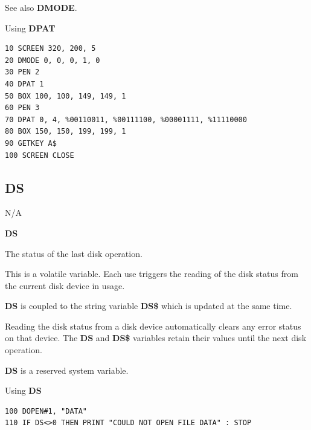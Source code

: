 \begin{description}[leftmargin=2cm,style=nextline]
                  See also {\bf DMODE}.

\item [Example:]  Using {\bf DPAT}

\begin{tcolorbox}[colback=black,coltext=white]
\verbatimfont{\codefont}
\begin{verbatim}
10 SCREEN 320, 200, 5
20 DMODE 0, 0, 0, 1, 0
30 PEN 2
40 DPAT 1
50 BOX 100, 100, 149, 149, 1
60 PEN 3
70 DPAT 0, 4, %00110011, %00111100, %00001111, %11110000
80 BOX 150, 150, 199, 199, 1
90 GETKEY A$
100 SCREEN CLOSE
\end{verbatim}
\end{tcolorbox}
\end{description}


\newpage
\subsection{DS}
\begin{description}[leftmargin=2cm,style=nextline]
\item [Token:]    N/A

\item [Format:]   {\bf DS}

\item [Usage:]    The status of the last disk operation.

                  This is a volatile variable. Each use triggers the reading of the disk status from the current disk device in usage.

                  {\bf DS} is coupled to the string variable {\bf DS\$} which is updated at the same time.

                  Reading the disk status from a disk device automatically clears any error status on that device. The {\bf DS} and {\bf DS\$} variables retain their values until the next disk operation.

\item [Remarks:]  {\bf DS} is a reserved system variable.

\item [Example:]  Using {\bf DS}

\begin{tcolorbox}[colback=black,coltext=white]
\verbatimfont{\codefont}
\begin{verbatim}
100 DOPEN#1, "DATA"
110 IF DS<>0 THEN PRINT "COULD NOT OPEN FILE DATA" : STOP
\end{verbatim}
\end{tcolorbox}
\end{description}

